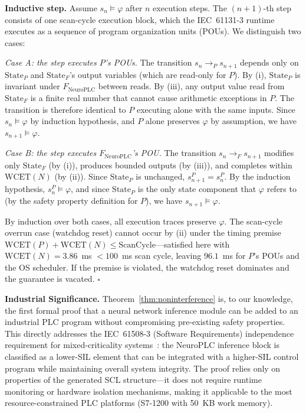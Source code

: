 \begin{enumerate}[label=(\roman*)]
    \textbf{Inductive step.} Assume $s_n \models \varphi$ after $n$
    execution steps. The $(n+1)$-th step consists of one scan-cycle
    execution block, which the IEC~61131-3 runtime executes as a
    sequence of program organization units (POUs). We distinguish
    two cases:

    \textit{Case A: the step executes $P$'s POUs.} The transition
    $s_n \to_P s_{n+1}$ depends only on $\text{State}_P$ and
    $\text{State}_F$'s output variables (which are read-only for $P$).
    By (i), $\text{State}_P$ is invariant under $F_{\text{NeuroPLC}}$
    between reads. By (iii), any output value read from
    $\text{State}_F$ is a finite real number that cannot cause
    arithmetic exceptions in $P$. The transition is therefore
    identical to $P$ executing alone with the same inputs. Since
    $s_n \models \varphi$ by induction hypothesis, and $P$ alone
    preserves $\varphi$ by assumption, we have $s_{n+1} \models \varphi$.

    \textit{Case B: the step executes $F_{\text{NeuroPLC}}$'s POU.}
    The transition $s_n \to_F s_{n+1}$ modifies only $\text{State}_F$
    (by (i)), produces bounded outputs (by (iii)), and completes within
    $\text{WCET}(N)$ (by (ii)). Since $\text{State}_P$ is unchanged,
    $s_{n+1}^P = s_n^P$. By the induction hypothesis, $s_n^P \models
    \varphi$, and since $\text{State}_P$ is the only state component
    that $\varphi$ refers to (by the safety property definition for
    $P$), we have $s_{n+1} \models \varphi$.

    By induction over both cases, all execution traces preserve
    $\varphi$. The scan-cycle overrun case (watchdog reset) cannot
    occur by (ii) under the timing premise
    $\text{WCET}(P) + \text{WCET}(N) \leq \text{ScanCycle}$---satisfied
    here with $\text{WCET}(N) = 3.86$~ms $< 100$~ms scan cycle,
    leaving $96.1$~ms for $P$'s POUs and the OS scheduler. If the
    premise is violated, the watchdog reset dominates and the
    guarantee is vacated. $\square$
\end{enumerate}

\vspace{4pt}
\noindent\textbf{Industrial Significance.}
Theorem~\ref{thm:noninterference} is, to our knowledge, the first formal proof that a
neural network inference module can be added to an industrial PLC
program without compromising pre-existing safety properties. This
directly addresses the IEC~61508-3 (Software Requirements) independence
requirement for mixed-criticality systems~\cite{iec61508_2010}:
the NeuroPLC inference block is classified as a lower-SIL element
that can be integrated with a higher-SIL control program while
maintaining overall system integrity. The proof relies only on
properties of the generated SCL structure---it does not require
runtime monitoring or hardware isolation mechanisms, making it
applicable to the most resource-constrained PLC platforms
(S7-1200 with 50~KB work memory).

